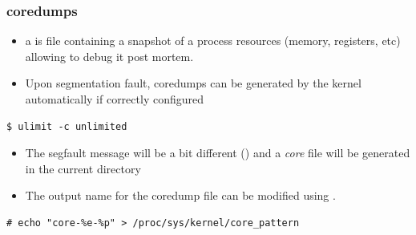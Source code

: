 \begin{frame}[fragile]
  \frametitle{coredumps}
  \begin{itemize}
    \item a  is file containing a snapshot of a process resources
          (memory, registers, etc) allowing to debug it post mortem.
    \item Upon segmentation fault, coredumps can be generated by the kernel
          automatically if correctly configured
  \end{itemize}

  \begin{block}{}
    \begin{verbatim}
$ ulimit -c unlimited
    \end{verbatim}
  \end{block}

  \begin{itemize}
    \item The segfault message will be a bit different () and a {\em core} file will be generated in the
          current directory
    \item The output name for the coredump file can be modified using
          .
  \end{itemize}

\begin{block}{}
  \begin{verbatim}
# echo "core-%e-%p" > /proc/sys/kernel/core_pattern
  \end{verbatim}
\end{block}
\end{frame}

